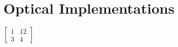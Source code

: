 \chapter{Optical Implementations\label{ch:optimp}}
$\left[\begin{array}{cc}1 & 12\\
3 & 4\end{array}\right]$
